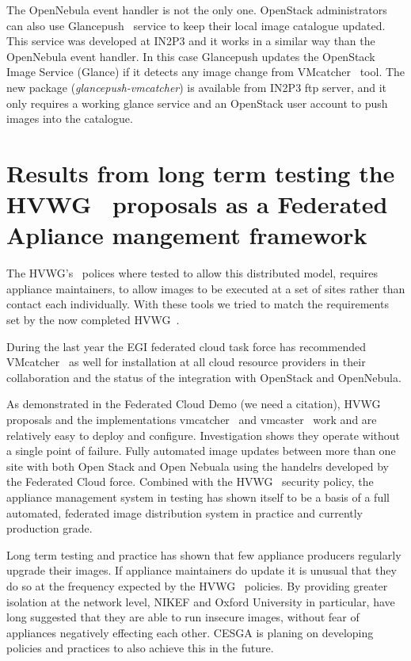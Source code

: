 \documentclass{llncs_Ibergrid2013}
\begin{document}
The OpenNebula event handler is not the only one. OpenStack administrators can also use Glancepush~\cite{glancepush} service to keep their local image catalogue updated. 
This service was developed at IN2P3 and it works in a similar way than the OpenNebula event handler. 
In this case Glancepush updates the OpenStack Image Service (Glance) if it detects any image change from VMcatcher~\cite{vmcatcher} tool. 
The new package (\textit{glancepush-vmcatcher}) is available from IN2P3 ftp server, and it only requires a working glance service and an OpenStack user account to push images into the catalogue.



\section{Results from long term testing the HVWG~\cite{hepix} proposals as a Federated Apliance mangement framework}
\label{sect-experiances}
The HVWG's~\cite{hepix} polices where tested to allow this distributed model, requires appliance maintainers, to allow images to be executed at a set of sites rather than contact each individually. With these tools we tried to match the requirements set by the now completed HVWG~\cite{hepix}.

During the last year the EGI federated cloud task force has recommended VMcatcher~\cite{vmcatcher} as well for installation at all cloud resource providers in their collaboration and the status of the integration with OpenStack and OpenNebula.

As demonstrated in the Federated Cloud Demo (we need a citation), HVWG~\cite{hepix} proposals and the implementations vmcatcher~\cite{vmcatcher} and vmcaster~\cite{vmcaster} work and are relatively easy to deploy and configure. Investigation shows they operate without a single point of failure. Fully automated image updates between more than one site with both Open Stack and Open Nebuala using the handelrs developed by the Federated Cloud force. Combined with the HVWG~\cite{hepix} security policy, the appliance management system in testing has shown itself to be a basis of a full automated, federated image distribution system in practice and currently production grade.

Long term testing and practice has shown that few appliance producers regularly upgrade their images. If appliance maintainers do update it is unusual that they do so at the frequency expected by the HVWG~\cite{hepix} policies. By providing greater isolation at the network level, NIKEF and Oxford University in particular, have long suggested that they are able to run insecure images, without fear of appliances negatively effecting each other. CESGA is planing on developing policies and practices to also achieve this in the future.
\end{document}
